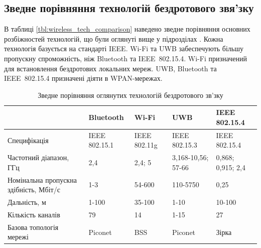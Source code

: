 \documentclass[a4paper,ukrainian,utf8,nocolumnsxix,floatsection]{eskdtext}
\newcommand{\iee}[0]{IEEE~802.15.4\xspace}
\begin{document}
\subsection{Зведне порівняння технологій бездротового звя’зку}

В таблиці \ref{tbl:wireless_tech_comparison} наведено зведне порівняння основних розбіжностей технологій, що були оглянуті вище у підрозділах . Кожна технологія базується на стандарті IEEE. Wi-Fi та UWB забеспечують більшу пропускну спроможність, ніж Bluetooth та \iee. Wi-Fi призначений для встановлення бездротових локальних мереж. UWB, Bluetooth та \iee призначені діяти в WPAN-мережах.


\begin{table}[htbp]
\caption{Зведне порівняння оглянутих технологій бездротового зв’зку}
\begin{tabular}{|p{}|p{}|p{}|p{}|p{}|}
\hline
                                       & Bluetooth               & Wi-Fi                                                  & UWB                     & IEEE 802.15.4            \\ \hline
Специфікація                           & IEEE 802.15.1 	         & IEEE 802.11g                                           & IEEE 802.15.3           & IEEE 802.15.4            \\ \hline
Частотний діапазон, ГГц                & 2,4                     & 2,4; 5                                                 & 3,168-10,56; 57-66      & 0,868; 0,915; 2,4        \\ \hline
Номінальна пропускна здібність, Мбіт/с & 1-3                     & 54-600                                                 & 110-5750                & 0,25                     \\ \hline
Дальність, м                           & 1-100                   & 35-100                                                 & 1-10                    & 10-100                   \\ \hline
Кількість каналів                      & 79                      & 14                                                     & 1-15                    & 27                       \\ \hline
Базова топологія мережі                & Piconet                 & BSS                                                    & Piconet                 & Зірка                    \\ \hline

\end{tabular}
\end{table}
\end{document}
